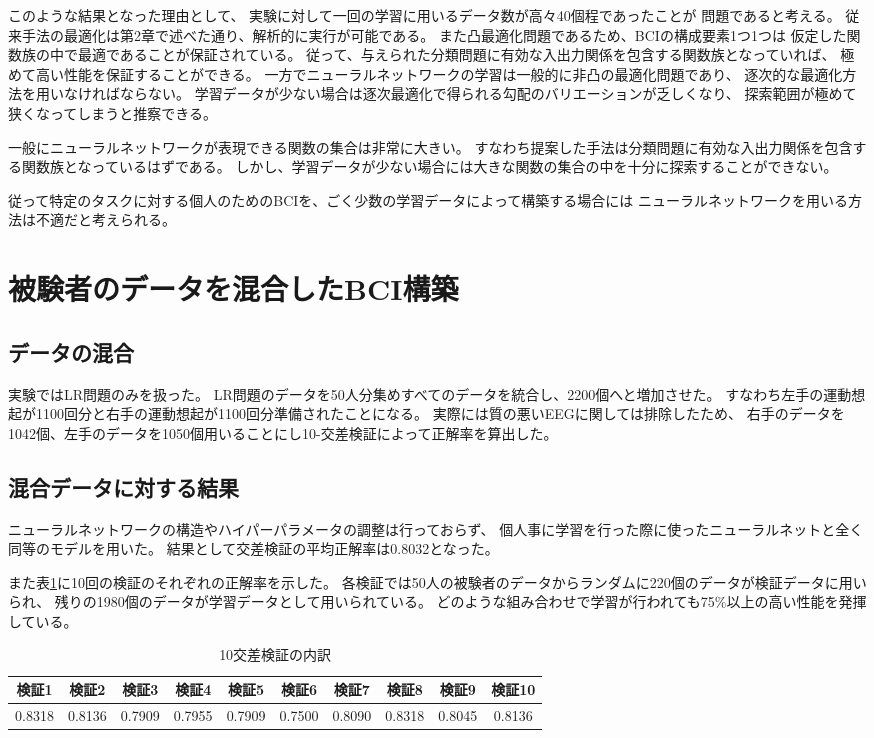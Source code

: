 このような結果となった理由として、
実験に対して一回の学習に用いるデータ数が高々40個程であったことが
問題であると考える。
従来手法の最適化は第2章で述べた通り、解析的に実行が可能である。
また凸最適化問題であるため、BCIの構成要素1つ1つは
仮定した関数族の中で最適であることが保証されている。
従って、与えられた分類問題に有効な入出力関係を包含する関数族となっていれば、
極めて高い性能を保証することができる。
一方でニューラルネットワークの学習は一般的に非凸の最適化問題であり、
逐次的な最適化方法を用いなければならない。
学習データが少ない場合は逐次最適化で得られる勾配のバリエーションが乏しくなり、
探索範囲が極めて狭くなってしまうと推察できる。

一般にニューラルネットワークが表現できる関数の集合は非常に大きい。
すなわち提案した手法は分類問題に有効な入出力関係を包含する関数族となっているはずである。
しかし、学習データが少ない場合には大きな関数の集合の中を十分に探索することができない。

従って特定のタスクに対する個人のためのBCIを、ごく少数の学習データによって構築する場合には
ニューラルネットワークを用いる方法は不適だと考えられる。

\section{\mc 被験者のデータを混合したBCI構築}
\subsection{\mc データの混合}
実験ではLR問題のみを扱った。
LR問題のデータを50人分集めすべてのデータを統合し、2200個へと増加させた。
すなわち左手の運動想起が1100回分と右手の運動想起が1100回分準備されたことになる。
実際には質の悪いEEGに関しては排除したため、
右手のデータを1042個、左手のデータを1050個用いることにし10-交差検証によって正解率を算出した。

\subsection{\mc 混合データに対する結果}
ニューラルネットワークの構造やハイパーパラメータの調整は行っておらず、
個人事に学習を行った際に使ったニューラルネットと全く同等のモデルを用いた。
結果として交差検証の平均正解率は0.8032となった。

また表\ref{table:allvalidation}に10回の検証のそれぞれの正解率を示した。
各検証では50人の被験者のデータからランダムに220個のデータが検証データに用いられ、
残りの1980個のデータが学習データとして用いられている。
どのような組み合わせで学習が行われても75\%以上の高い性能を発揮している。
\begin{table}[t]
    \centering
    \caption{10交差検証の内訳}
    \begin{tabular}{|c|c|c|c|c|c|c|c|c|c|} \hline
        検証1 & 検証2 & 検証3 & 検証4 & 検証5 &
        検証6 & 検証7 & 検証8 & 検証9 & 検証10 \\ \hline
        0.8318 & 0.8136 & 0.7909 & 0.7955 & 0.7909 &
        0.7500 & 0.8090 & 0.8318 & 0.8045 & 0.8136 \\ \hline
    \end{tabular}
    \label{table:allvalidation}
\end{table}

